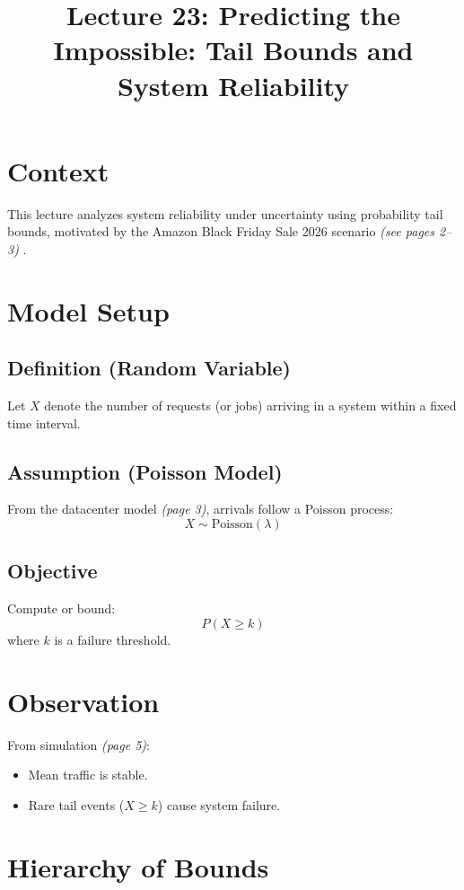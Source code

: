 \documentclass[12pt]{article}
\title{Lecture 23: Predicting the Impossible: Tail Bounds and System Reliability}
\author{}
\date{}
\begin{document}
\maketitle

\section*{Context}
This lecture analyzes system reliability under uncertainty using probability tail bounds, motivated by the Amazon Black Friday Sale 2026 scenario \textit{(see pages 2--3)} \cite{lecture}.

\section*{Model Setup}

\subsection*{Definition (Random Variable)}
Let $X$ denote the number of requests (or jobs) arriving in a system within a fixed time interval.

\subsection*{Assumption (Poisson Model)}
From the datacenter model \textit{(page 3)}, arrivals follow a Poisson process:
\[
X \sim \text{Poisson}(\lambda)
\]

\subsection*{Objective}
Compute or bound:
\[
P(X \ge k)
\]
where $k$ is a failure threshold.

\section*{Observation}
From simulation \textit{(page 5)}:
\begin{itemize}
    \item Mean traffic is stable.
    \item Rare tail events ($X \ge k$) cause system failure.
\end{itemize}

\section*{Hierarchy of Bounds}
\end{document}
